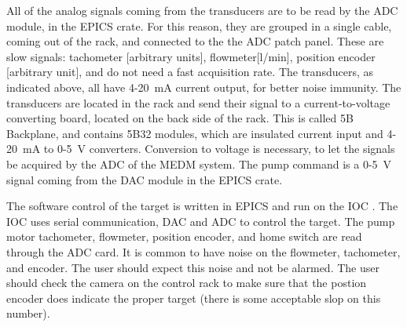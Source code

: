 { %


All of the analog signals coming from the transducers are to be read
by the ADC module, in the EPICS crate. For this reason, they are grouped
in a single cable, coming out of the rack, and connected to the the
ADC patch panel. These are slow signals: tachometer {[}arbitrary units{]},
flowmeter{[}l/min{]}, position encoder {[}arbitrary unit{]}, and do
not need a fast acquisition rate. The transducers, as indicated above,
all have 4-20~mA current output, for better noise immunity. The transducers
are located in the rack and send their signal to a current-to-voltage
converting board, located on the back side of the rack. This is called
5B Backplane, and contains 5B32 modules, which are insulated current
input and 4-20~mA to 0-5~V converters. Conversion to voltage is
necessary, to let the signals be acquired by the ADC of the MEDM system.
The pump command is a 0-5~V signal coming from the DAC module in
the EPICS crate.

The software control of the target is written in EPICS and run on
the IOC . The IOC uses serial communication, DAC
and ADC to control the target. The pump motor tachometer, flowmeter,
position encoder, and home switch are read through the ADC card. It
is common to have noise on the flowmeter, tachometer, and encoder.
The user should expect this noise and not be alarmed. The user should
check the camera on the control rack to make sure that the postion
encoder does indicate the proper target (there is some acceptable
slop on this number).

}
